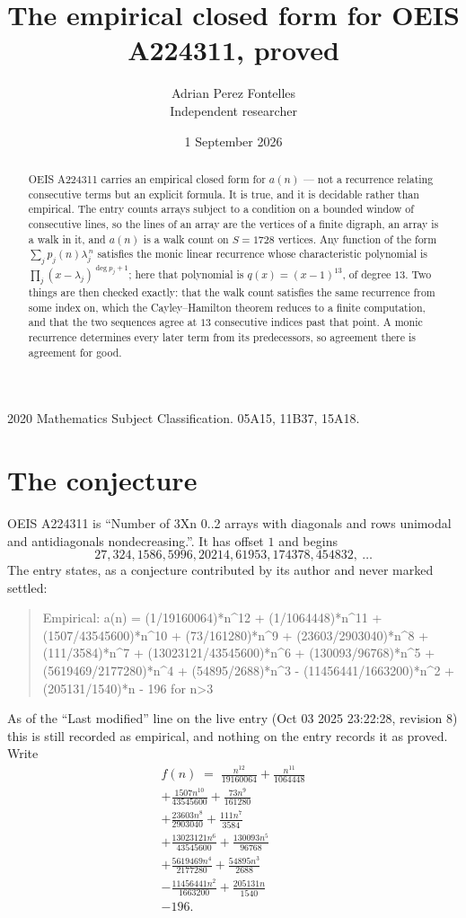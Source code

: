 \documentclass[11pt,a4paper]{article}
\title{The empirical closed form for OEIS A224311, proved}
\author{Adrian Perez Fontelles\\ \small Independent researcher}
\date{1 September 2026}
\theoremstyle{plain}
\theoremstyle{definition}
\begin{document}
\maketitle

\begin{abstract}
OEIS A224311 carries an empirical closed form for $a(n)$ --- not a recurrence relating
consecutive terms but an explicit formula. It is true, and it is decidable rather than
empirical. The entry counts arrays subject to a condition on a bounded window of consecutive lines, so the lines of an array are the
vertices of a finite digraph, an array is a walk in it, and $a(n)$ is a walk count on
$S=1728$ vertices. Any function of the form $\sum_j p_j(n)\lambda_j^{\,n}$ satisfies the
monic linear recurrence whose characteristic polynomial is
$\prod_j(x-\lambda_j)^{\deg p_j+1}$; here that polynomial is $q(x)=(x-1)^{13}$, of degree
$13$. Two things are then checked exactly: that the walk count satisfies the same
recurrence from some index on, which the Cayley--Hamilton theorem reduces to a finite
computation, and that the two sequences agree at $13$ consecutive indices past that
point. A monic recurrence determines every later term from its predecessors, so agreement
there is agreement for good.
\end{abstract}

\noindent\small 2020 Mathematics Subject Classification. 05A15, 11B37, 15A18.\normalsize

\section{The conjecture}

OEIS A224311 is ``Number of 3Xn 0..2 arrays with diagonals and rows unimodal and antidiagonals nondecreasing.''. It has offset $1$ and begins
\[
27, 324, 1586, 5996, 20214, 61953, 174378, 454832,\ \dots
\]
The entry states, as a conjecture contributed by its author and never marked settled:
\begin{quote}
Empirical: a(n) = (1/19160064)*n\^{}12 + (1/1064448)*n\^{}11 + (1507/43545600)*n\^{}10 + (73/161280)*n\^{}9 + (23603/2903040)*n\^{}8 + (111/3584)*n\^{}7 + (13023121/43545600)*n\^{}6 + (130093/96768)*n\^{}5 + (5619469/2177280)*n\^{}4 + (54895/2688)*n\^{}3 - (11456441/1663200)*n\^{}2 + (205131/1540)*n - 196 for n>3
\end{quote}
As of the ``Last modified'' line on the live entry (Oct 03 2025 23:22:28, revision 8) this is still
recorded as empirical, and nothing on the entry records it as proved. Write
\begin{multline*}
f(n)\;=\;\frac{n^{12}}{19160064} + \frac{n^{11}}{1064448} \\
+ \frac{1507 n^{10}}{43545600} + \frac{73 n^{9}}{161280} \\
+ \frac{23603 n^{8}}{2903040} + \frac{111 n^{7}}{3584} \\
+ \frac{13023121 n^{6}}{43545600} + \frac{130093 n^{5}}{96768} \\
+ \frac{5619469 n^{4}}{2177280} + \frac{54895 n^{3}}{2688} \\
- \frac{11456441 n^{2}}{1663200} + \frac{205131 n}{1540} \\
- 196.
\end{multline*}
\end{document}
